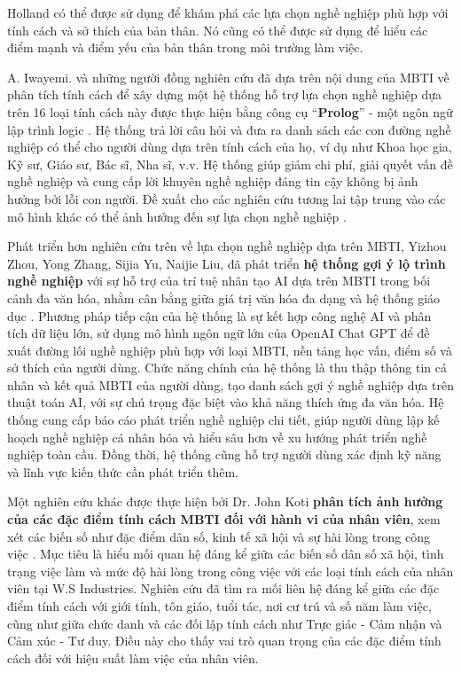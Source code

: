 Holland có thể được sử dụng để khám phá các lựa chọn nghề nghiệp phù hợp với tính cách và sở thích của bản thân. Nó cũng có thể được sử dụng để hiểu các điểm mạnh và điểm yếu của bản thân trong môi trường làm việc. 

A. Iwayemi. và những người đồng nghiên cứu đã dựa trên nội dung của MBTI về phân tích  tính cách để xây dựng một hệ thống hỗ trợ lựa chọn nghề nghiệp dựa trên 16 loại tính cách này được thực hiện bằng công cụ “\textbf{Prolog}” - một ngôn ngữ lập trình logic \cite{iwayemi}. Hệ thống trả lời câu hỏi và đưa ra danh sách các con đường nghề nghiệp có thể cho người dùng dựa trên tính cách của họ, ví dụ như Khoa học gia, Kỹ sư, Giáo sư, Bác sĩ, Nha sĩ, v.v. Hệ thống giúp giảm chi phí, giải quyết vấn đề nghề nghiệp và cung cấp lời khuyên nghề nghiệp đáng tin cậy không bị ảnh hưởng bởi lỗi con người. Đề xuất cho các nghiên cứu tương lai tập trung vào các mô hình khác có thể ảnh hưởng đến sự lựa chọn nghề nghiệp . 

Phát triển hơn nghiên cứu trên về lựa chọn nghề nghiệp dựa trên MBTI, Yizhou Zhou, Yong Zhang, Sijia Yu, Naijie Liu, đã phát triển \textbf{hệ thống gợi ý lộ trình nghề nghiệp} với sự hỗ trợ của trí tuệ nhân tạo AI dựa trên MBTI trong bối cảnh đa văn hóa, nhằm cân bằng giữa giá trị văn hóa đa dạng và hệ thống giáo dục \cite{yizhou}. Phương pháp tiếp cận của hệ thống là sự kết hợp công nghệ AI và phân tích dữ liệu lớn, sử dụng mô hình ngôn ngữ lớn của OpenAI Chat GPT để đề xuất đường lối nghề nghiệp phù hợp với loại MBTI, nền tảng học vấn, điểm số và sở thích của người dùng. Chức năng chính của hệ thống là thu thập thông tin cá nhân và kết quả MBTI của người dùng, tạo danh sách gợi ý nghề nghiệp dựa trên thuật toán AI, với sự chú trọng đặc biệt vào khả năng thích ứng đa văn hóa. Hệ thống cung cấp báo cáo phát triển nghề nghiệp chi tiết, giúp người dùng lập kế hoạch nghề nghiệp cá nhân hóa và hiểu sâu hơn về xu hướng phát triển nghề nghiệp toàn cầu. Đồng thời, hệ thống cũng hỗ trợ người dùng xác định kỹ năng và lĩnh vực kiến thức cần phát triển thêm. 

Một nghiên cứu khác được thực hiện bởi Dr. John Koti \textbf{phân tích ảnh hưởng của các đặc điểm tính cách MBTI đối với hành vi của nhân viên}, xem xét các biến số như đặc điểm dân số, kinh tế xã hội và sự hài lòng trong công việc \cite{drjohn}. Mục tiêu là hiểu mối quan hệ đáng kể giữa các biến số dân số xã hội, tình trạng việc làm và mức độ hài lòng trong công việc với các loại tính cách của nhân viên tại W.S Industries. Nghiên cứu đã tìm ra mối liên hệ đáng kể giữa các đặc điểm tính cách với giới tính, tôn giáo, tuổi tác, nơi cư trú và số năm làm việc, cũng như giữa chức danh và các đối lập tính cách như Trực giác - Cảm nhận và Cảm xúc - Tư duy. Điều này cho thấy vai trò quan trọng của các đặc điểm tính cách đối với hiệu suất làm việc của nhân viên.

